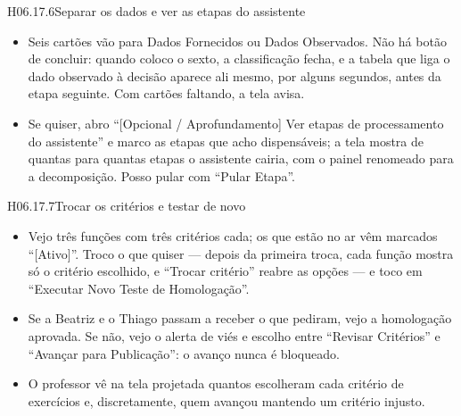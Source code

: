 \begin{historia}{H06.17.6}{Separar os dados e ver as etapas do assistente}{\pronto}
\aceite
\begin{itemize}
  \item Seis cartões vão para Dados Fornecidos ou Dados Observados. Não há
    botão de concluir: quando coloco o sexto, a classificação fecha, e a
    tabela que liga o dado observado à decisão aparece ali mesmo, por alguns
    segundos, antes da etapa seguinte. Com cartões faltando, a tela avisa.
  \item Se quiser, abro \enquote{[Opcional / Aprofundamento] Ver etapas de
    processamento do assistente} e marco as etapas que acho dispensáveis; a
    tela mostra de quantas para quantas etapas o assistente cairia, com o
    painel renomeado para a decomposição. Posso pular com \enquote{Pular
    Etapa}.
\end{itemize}
\end{historia}

\begin{historia}{H06.17.7}{Trocar os critérios e testar de novo}{\pronto}
\aceite
\begin{itemize}
  \item Vejo três funções com três critérios cada; os que estão no ar vêm
    marcados \enquote{[Ativo]}. Troco o que quiser --- depois da primeira
    troca, cada função mostra só o critério escolhido, e \enquote{Trocar
    critério} reabre as opções --- e toco em \enquote{Executar Novo Teste de
    Homologação}.
  \item Se a Beatriz e o Thiago passam a receber o que pediram, vejo a
    homologação aprovada. Se não, vejo o alerta de viés e escolho entre
    \enquote{Revisar Critérios} e \enquote{Avançar para Publicação}: o
    avanço nunca é bloqueado.
  \item O professor vê na tela projetada quantos escolheram cada critério de
    exercícios e, discretamente, quem avançou mantendo um critério injusto.
\end{itemize}
\end{historia}

